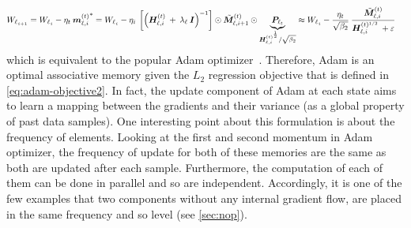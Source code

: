 \begin{align}
    &{W_{\ell}}_{_{i+1}} = {W_{\ell}}_{_{i}} - \eta_t \: {\boldsymbol{m}^{(t)}_{\ell, i}}^{*} = {W_{\ell}}_{_{i}} - \eta_i \:  \left[  \left( \boldsymbol{H}^{(t)}_{\ell, i} \: + \: \lambda_{\ell}\: \boldsymbol{I} \right)^{-1}\right] \odot \tilde{\boldsymbol{M}}^{(t)}_{\ell, i+1} \odot \underset{\boldsymbol{H}^{(t)^{\frac{1}{2}}}_{\ell, i} / \sqrt{\beta_2}}{\underbrace{\boldsymbol{P}_{\ell_{t}}}} \approx {W_{\ell}}_{_{i}} - \frac{\eta_t}{\sqrt{\beta_2}} \: \frac{\tilde{\boldsymbol{M}}^{(t)}_{\ell, i}}{\boldsymbol{H}^{(t)^{1/2}}_{\ell, i} \: + \varepsilon}
\end{align}
which is equivalent to the popular Adam optimizer~\citep{kingma2014adam}. Therefore, Adam is an optimal associative memory given the $L_2$ regression objective that is defined in \autoref{eq:adam-objective2}. In fact, the update component of Adam at each state aims to learn a mapping between the gradients and their variance (as a global property of past data samples). One interesting point about this formulation is about the frequency of elements. Looking at the first and second momentum in Adam optimizer, the frequency of update for both of these memories are the same as both are updated after each sample. Furthermore, the computation of each of them can be done in parallel and so are independent. Accordingly, it is one of the few examples that two components without any internal gradient flow, are placed in the same frequency and so level (see \autoref{sec:nop}).  

